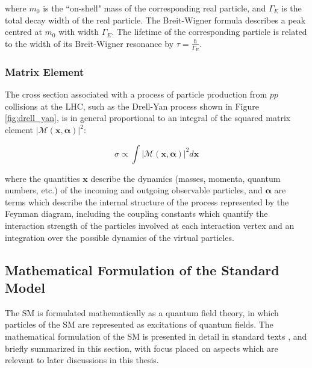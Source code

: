 \noindent where \(m_0\) is the ``on-shell" mass of the corresponding real particle, and \(\Gamma_E\) is the total decay width of the real particle. The Breit-Wigner formula describes a peak centred at \(m_0\) with width \(\Gamma_E\). The lifetime of the corresponding particle is related to the width of its Breit-Wigner resonance by \(\tau = \frac{\hbar}{\Gamma_E}\).

\subsubsection{Matrix Element}


The cross section associated with a process of particle production from \(pp\) collisions at the LHC, such as the Drell-Yan process shown in Figure \ref{fig:drell_yan}, is in general proportional to an integral of the squared matrix element \(|\mathcal{M(\boldsymbol{x}, \boldsymbol{\alpha})}|^2\):

\begin{equation}
\label{eq:matrix_element}
\sigma \propto \int|\mathcal{M(\boldsymbol{x}, \boldsymbol{\alpha})}|^2 d\boldsymbol{x} 
\end{equation}

\noindent where the quantities \(\boldsymbol{x}\) describe the dynamics (masses, momenta, quantum numbers, etc.) of the incoming and outgoing observable particles, and \(\boldsymbol{\alpha}\) are terms which describe the internal structure of the process represented by the Feynman diagram, including the coupling constants which quantify the interaction strength of the particles involved at each interaction vertex and an integration over the possible dynamics of the virtual particles. 

\subsection{Mathematical Formulation of the Standard Model}

The SM is formulated mathematically as a quantum field theory, in which particles of the SM are represented as excitations of quantum fields. The mathematical formulation of the SM is presented in detail in standard texts \cite{griffiths_2008, SM_intro}, and briefly summarized in this section, with focus placed on aspects which are relevant to later discussions in this thesis.

